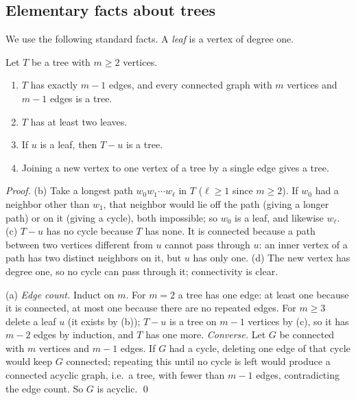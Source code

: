 \documentclass[11pt]{article}
\begin{document}
\subsection{Elementary facts about trees}\label{sec:basic}
We use the following standard facts. A \emph{leaf} is a vertex of degree
one.

\begin{theorembox}
Let $T$ be a tree with $m\ge 2$ vertices.
\begin{enumerate}[leftmargin=1.8em,itemsep=1pt,label=(\alph*)]
  \item $T$ has exactly $m-1$ edges, and every connected graph with $m$
        vertices and $m-1$ edges is a tree.
  \item $T$ has at least two leaves.
  \item If $u$ is a leaf, then $T-u$ is a tree.
  \item Joining a new vertex to one vertex of a tree by a single edge
        gives a tree.
\end{enumerate}

\emph{Proof.} (b) Take a longest path $w_0w_1\cdots w_\ell$
in $T$ ($\ell\ge1$ since $m\ge2$). If $w_0$ had a neighbor other than
$w_1$, that neighbor would lie off the path (giving a longer path) or on
it (giving a cycle), both impossible; so $w_0$ is a leaf, and likewise
$w_\ell$. (c) $T-u$ has no cycle because $T$ has none. It is connected
because a path between two vertices different from $u$ cannot pass through
$u$: an inner vertex of a path has two distinct neighbors on it, but $u$
has only one. (d) The new vertex has degree one, so no cycle can pass
through it; connectivity is clear.

(a) \emph{Edge count.} Induct on $m$. For $m=2$ a tree has one edge: at
least one because it is connected, at most one because there are no
repeated edges. For $m\ge3$ delete a leaf $u$ (it exists by (b)); $T-u$ is
a tree on $m-1$ vertices by (c), so it has $m-2$ edges by induction, and $T$
has one more. \emph{Converse.} Let $G$ be connected with $m$ vertices and
$m-1$ edges. If $G$ had a cycle, deleting one edge of that cycle would keep
$G$ connected; repeating this until no cycle is left would produce a
connected acyclic graph, i.e.\ a tree, with fewer than $m-1$ edges,
contradicting the edge count. So $G$ is acyclic. \qed
\end{theorembox}
\end{document}
